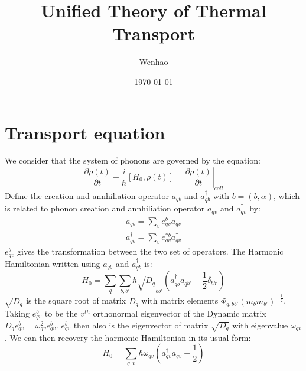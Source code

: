 \documentclass{article}
\begin{document}
\title{Unified Theory of Thermal Transport}
\author{Wenhao}
\date{\today}
\maketitle
\section{Transport equation}
We consider that the system of phonons are governed by the equation:
\begin{equation}
    \frac{\partial \rho(t)}{\partial t} + \frac{i}{\hbar} \left[H_0, \rho(t)\right] = \left. \frac{\partial\rho(t) }{\partial t} \right|_{coll} \label{master}
\end{equation}
Define the creation and annhiliation operator $a_{qb}$ and $a^{\dagger}_{qb}$ with 
$b = (b,\alpha)$, which is related 
to phonon creation and annhiliation operator $a_{qv}$ and $a^{\dagger}_{qv}$ by:
\begin{align}
    a_{qb} = \sum_v e^b_{qv} a_{qv} \\
    a^{\dagger}_{qb} = \sum_v e^{*b}_{qv} a^{\dagger}_{qv}
\end{align}
$e^b_{qv}$ gives the transformation between the two set of operators. 
The Harmonic Hamiltonian written using $a_{qb}$ and $a^{\dagger}_{qb}$ is:
\begin{equation}
    H_0 = \sum_{q} \sum_{b,b'} \hbar \sqrt{D_q}_{bb'} \left( a^{\dagger}_{qb}a_{qb'} + \frac{1}{2} \delta_{bb'} \right)
\end{equation}
$\sqrt{D_q}$ is the square root of matrix $D_q$ with matrix 
elements $\Phi_{q,bb'} (m_b m_{b'})^{-\frac{1}{2}}$.
Taking $e^b_{qv}$ to be the $v^{th}$ orthonormal eigenvector of the 
Dynamic matrix $D_q e^b_{qv} = \omega^2_{qv}e^b_{qv}$. $e^b_{qv}$ then also
is the eigenvector of matrix $\sqrt{D_q}$ with eigenvalue $\omega_{qv}$. We can then recovery
the harmonic Hamiltonian in its usual form:
\begin{equation}
    H_0 = \sum_{q,v} \hbar \omega_{qv} \left( a^{\dagger}_{qv}a_{qv} + \frac{1}{2} \right)
\end{equation}
\end{document}
